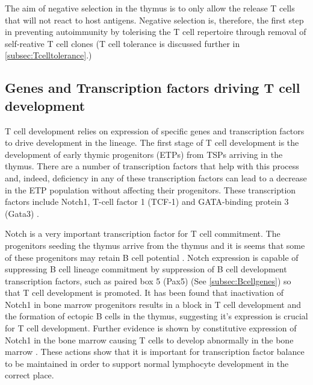 The aim of negative selection in the thymus is to only allow the release T cells that will not react to host antigens.
Negative selection is, therefore, the first step in preventing autoimmunity by tolerising the T cell repertoire through removal of self-reative T cell clones \citep{Walker2002}
(T cell tolerance is discussed further in \cref{subsec:Tcelltolerance}.)


\subsection{Genes and Transcription factors driving T cell development}
\label{subsec:Tcellgenes}

T cell development relies on expression of specific genes and transcription factors to drive development in the lineage.
The first stage of T cell development is the development of early thymic progenitors (ETPs) from TSPs arriving in the thymus.
There are a number of transcription factors that help with this process and, indeed, deficiency in any of these transcription factors can lead to a decrease in the ETP population without affecting their progenitors.
These transcription factors include Notch1, T-cell factor 1 (TCF-1) and GATA-binding protein 3 (Gata3) \citep{Sambandam2005, Naito2011, Weber2011, Hosoya2009}.

Notch is a very important transcription factor for T cell commitment.
The progenitors seeding the thymus arrive from the thymus and it is seems that some of these progenitors may retain B cell potential \citep{Porritt2004}.
Notch expression is capable of suppressing B cell lineage commitment by suppression of B cell development transcription factors, such as paired box 5 (Pax5) (See \cref{subsec:Bcellgenes}) so that T cell development is promoted.
It has been found that inactivation of Notch1 in bone marrow progenitors results in a block in T cell development and the formation of ectopic B cells in the thymus, suggesting it's expression is crucial for T cell development.
Further evidence is shown by constitutive expression of Notch1 in the bone marrow causing T cells to develop abnormally in the bone marrow \citep{Radtke2013}.
These actions show that it is important for transcription factor balance to be maintained in order to support normal lymphocyte development in the correct place.

